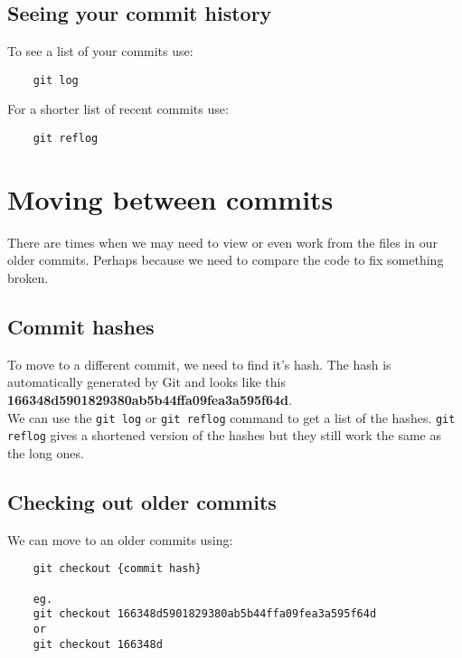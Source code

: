 \subsection{Seeing your commit history}

To see a list of your commits use:

\begin{verbatim}
    git log
\end{verbatim}

For a shorter list of recent commits use:

\begin{verbatim}
    git reflog
\end{verbatim}


\section{Moving between commits}

There are times when we may need to view or even work from the files in our older commits. Perhaps because we need to compare the code to fix something broken.
\\

\subsection{Commit hashes}

To move to a different commit, we need to find it's hash. The hash is automatically generated by Git and looks like this \textbf{166348d5901829380ab5b44ffa09fea3a595f64d}. 
\\

We can use the \texttt{git log} or \texttt{git reflog} command to get a list of the hashes. \texttt{git reflog} gives a shortened version of the hashes but they still work the same as the long ones.
\\

\subsection{Checking out older commits}

We can move to an older commits using:

\begin{verbatim}
    git checkout {commit hash}

    eg.
    git checkout 166348d5901829380ab5b44ffa09fea3a595f64d
    or
    git checkout 166348d
\end{verbatim}

